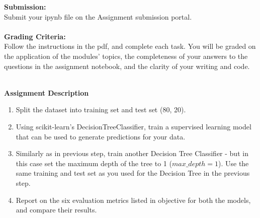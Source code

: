 \documentclass[letter-paper,12pt]{article} %
\begin{document}
\textbf{Submission:}\\

Submit your ipynb file on the Assignment submission portal. \\~\\


\textbf{Grading Criteria:}\\
Follow the instructions in the pdf, and complete each task. You will be graded on the application of the modules’ topics, the completeness of your answers to the questions in the assignment notebook, and the clarity of your writing and code.\\~\\


\newpage

\begin{center}
    \Large \textbf{Assignment Description}
\end{center}

\begin{enumerate}
    \item Split the dataset into training set and test set (80, 20).
    
    \item Using scikit-learn’s DecisionTreeClassifier, train a supervised learning model that can be used to generate predictions for your data.
    
    \item Similarly as in previous step, train another Decision Tree Classifier - but in this case set the maximum depth of the tree to 1 ($max\_depth=1$). Use the same training and test set as you used for the Decision Tree in the previous step. 

    \item Report on the six evaluation metrics listed in objective for both the models, and compare their results.\\
\end{enumerate}
\end{document}
